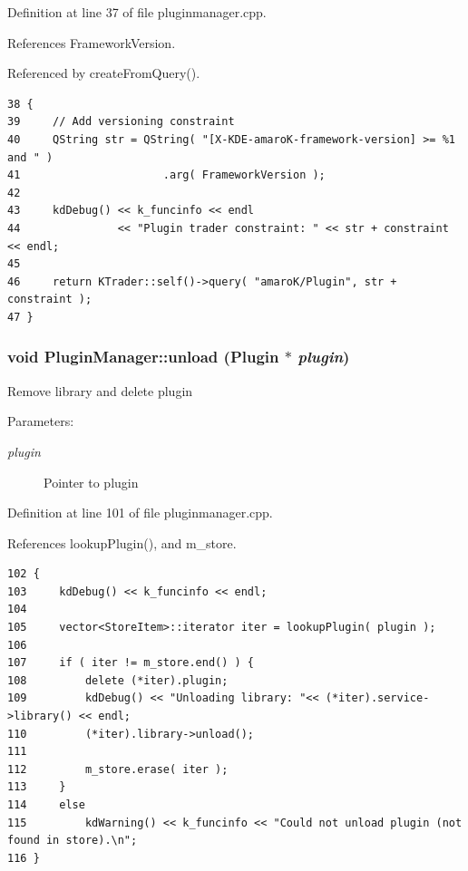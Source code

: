 Definition at line 37 of file pluginmanager.cpp.

References Framework\-Version.

Referenced by create\-From\-Query().



\footnotesize\begin{verbatim}38 {    
39     // Add versioning constraint
40     QString str = QString( "[X-KDE-amaroK-framework-version] >= %1 and " )
41                      .arg( FrameworkVersion );
42     
43     kdDebug() << k_funcinfo << endl
44               << "Plugin trader constraint: " << str + constraint << endl;
45     
46     return KTrader::self()->query( "amaroK/Plugin", str + constraint );
47 }    
\end{verbatim}\normalsize 
{}
\subsubsection{\setlength{\rightskip}{0pt plus 5cm}void Plugin\-Manager::unload ({\bf Plugin} $\ast$ {\em plugin})\hspace{0.3cm}{\tt  [static]}}\label{classPluginManager_PluginManagere3}


Remove library and delete plugin \begin{Desc}
\item[Parameters:]
\begin{description}
\item[{\em plugin}]Pointer to plugin \end{description}
\end{Desc}


Definition at line 101 of file pluginmanager.cpp.

References lookup\-Plugin(), and m\_\-store.



\footnotesize\begin{verbatim}102 {
103     kdDebug() << k_funcinfo << endl;
104     
105     vector<StoreItem>::iterator iter = lookupPlugin( plugin ); 
106             
107     if ( iter != m_store.end() ) {
108         delete (*iter).plugin;
109         kdDebug() << "Unloading library: "<< (*iter).service->library() << endl;
110         (*iter).library->unload();
111         
112         m_store.erase( iter );
113     }
114     else
115         kdWarning() << k_funcinfo << "Could not unload plugin (not found in store).\n";
116 }
\end{verbatim}\normalsize 


